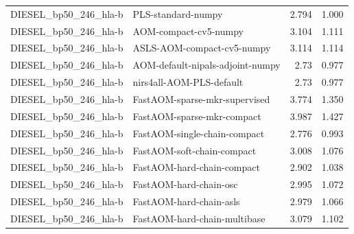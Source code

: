 \begin{landscape}
\begin{longtable}{L{8.0cm}L{9.5cm}rr}
DIESEL\_\allowbreak{}bp50\_\allowbreak{}246\_\allowbreak{}hla-\allowbreak{}b & PLS-\allowbreak{}standard-\allowbreak{}numpy & 2.794 & 1.000 \\
DIESEL\_\allowbreak{}bp50\_\allowbreak{}246\_\allowbreak{}hla-\allowbreak{}b & AOM-\allowbreak{}compact-\allowbreak{}cv5-\allowbreak{}numpy & 3.104 & 1.111 \\
DIESEL\_\allowbreak{}bp50\_\allowbreak{}246\_\allowbreak{}hla-\allowbreak{}b & ASLS-\allowbreak{}AOM-\allowbreak{}compact-\allowbreak{}cv5-\allowbreak{}numpy & 3.114 & 1.114 \\
DIESEL\_\allowbreak{}bp50\_\allowbreak{}246\_\allowbreak{}hla-\allowbreak{}b & AOM-\allowbreak{}default-\allowbreak{}nipals-\allowbreak{}adjoint-\allowbreak{}numpy & 2.73 & 0.977 \\
DIESEL\_\allowbreak{}bp50\_\allowbreak{}246\_\allowbreak{}hla-\allowbreak{}b & nirs4all-\allowbreak{}AOM-\allowbreak{}PLS-\allowbreak{}default & 2.73 & 0.977 \\
DIESEL\_\allowbreak{}bp50\_\allowbreak{}246\_\allowbreak{}hla-\allowbreak{}b & FastAOM-\allowbreak{}sparse-\allowbreak{}mkr-\allowbreak{}supervised & 3.774 & 1.350 \\
DIESEL\_\allowbreak{}bp50\_\allowbreak{}246\_\allowbreak{}hla-\allowbreak{}b & FastAOM-\allowbreak{}sparse-\allowbreak{}mkr-\allowbreak{}compact & 3.987 & 1.427 \\
DIESEL\_\allowbreak{}bp50\_\allowbreak{}246\_\allowbreak{}hla-\allowbreak{}b & FastAOM-\allowbreak{}single-\allowbreak{}chain-\allowbreak{}compact & 2.776 & 0.993 \\
DIESEL\_\allowbreak{}bp50\_\allowbreak{}246\_\allowbreak{}hla-\allowbreak{}b & FastAOM-\allowbreak{}soft-\allowbreak{}chain-\allowbreak{}compact & 3.008 & 1.076 \\
DIESEL\_\allowbreak{}bp50\_\allowbreak{}246\_\allowbreak{}hla-\allowbreak{}b & FastAOM-\allowbreak{}hard-\allowbreak{}chain-\allowbreak{}compact & 2.902 & 1.038 \\
DIESEL\_\allowbreak{}bp50\_\allowbreak{}246\_\allowbreak{}hla-\allowbreak{}b & FastAOM-\allowbreak{}hard-\allowbreak{}chain-\allowbreak{}osc & 2.995 & 1.072 \\
DIESEL\_\allowbreak{}bp50\_\allowbreak{}246\_\allowbreak{}hla-\allowbreak{}b & FastAOM-\allowbreak{}hard-\allowbreak{}chain-\allowbreak{}asls & 2.979 & 1.066 \\
DIESEL\_\allowbreak{}bp50\_\allowbreak{}246\_\allowbreak{}hla-\allowbreak{}b & FastAOM-\allowbreak{}hard-\allowbreak{}chain-\allowbreak{}multibase & 3.079 & 1.102 \\

\end{longtable}
\end{landscape}
